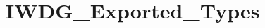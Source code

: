 \hypertarget{group___i_w_d_g___exported___types}{}\section{I\+W\+D\+G\+\_\+\+Exported\+\_\+\+Types}
\label{group___i_w_d_g___exported___types}
